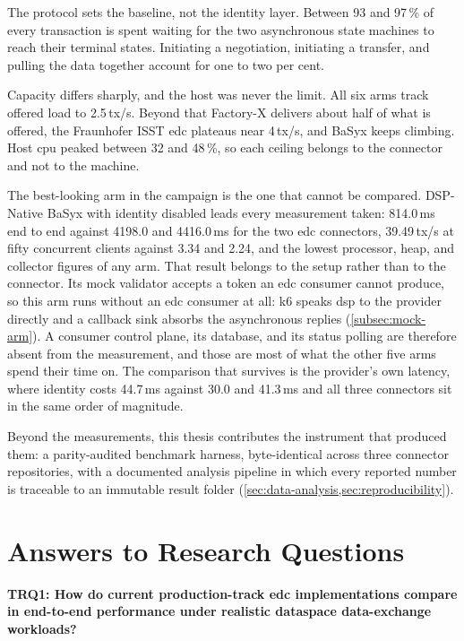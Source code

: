 The protocol sets the baseline, not the identity layer. Between 93 and 97\,\% of every
transaction is spent waiting for the two asynchronous state machines to reach their
terminal states. Initiating a negotiation, initiating a transfer, and pulling the data
together account for one to two per cent.

Capacity differs sharply, and the host was never the limit. All six arms track offered
load to 2.5\,tx/s. Beyond that Factory-X delivers about half of what is offered, the
Fraunhofer ISST \gls{edc} plateaus near 4\,tx/s, and BaSyx keeps climbing. Host \gls{cpu}
peaked between 32 and 48\,\%, so each ceiling belongs to the connector and not to the
machine.

The best-looking arm in the campaign is the one that cannot be compared. DSP-Native BaSyx
with identity disabled leads every measurement taken: 814.0\,ms end to end against
4198.0 and 4416.0\,ms for the two \gls{edc} connectors, 39.49\,tx/s at fifty concurrent
clients against 3.34 and 2.24, and the lowest processor, heap, and collector figures of
any arm. That result belongs to the setup rather than to the connector. Its mock validator
accepts a token an \gls{edc} consumer cannot produce, so this arm runs without an \gls{edc}
consumer at all: k6 speaks \gls{dsp} to the provider directly and a callback sink absorbs
the asynchronous replies (\cref{subsec:mock-arm}). A consumer control plane, its database,
and its status polling are therefore absent from the measurement, and those are most of
what the other five arms spend their time on. The comparison that survives is the
provider's own latency, where identity costs 44.7\,ms against 30.0 and 41.3\,ms and all
three connectors sit in the same order of magnitude.

Beyond the measurements, this thesis contributes the instrument that produced them: a
parity-audited benchmark harness, byte-identical across three connector repositories, with
a documented analysis pipeline in which every reported number is traceable to an immutable
result folder (\cref{sec:data-analysis,sec:reproducibility}).


\section{Answers to Research Questions}\label{sec:answers-rq}

\textbf{TRQ1: How do current production-track \gls{edc} implementations compare in
end-to-end performance under realistic dataspace data-exchange workloads?}

